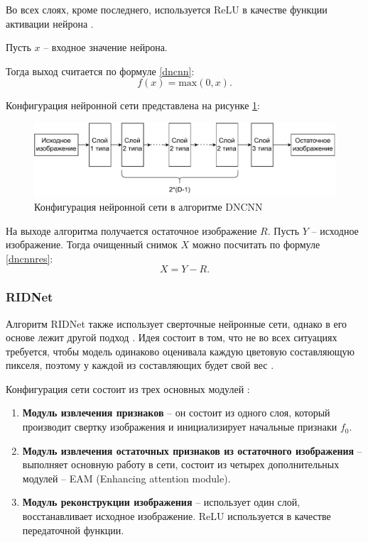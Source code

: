 Во всех слоях, кроме последнего, используется ReLU в качестве функции активации нейрона \cite{dcnn}. 

Пусть $x$ -- входное значение нейрона. 

Тогда выход считается по формуле \eqref{dncnn}: 
\begin{equation}
	\label{dncnn}
	f(x) = \mathrm{max}(0, x).
\end{equation}

Конфигурация нейронной сети представлена на рисунке \ref{fig::dncnn}:
\FloatBarrier
\begin{figure}[h]	
	\begin{center}
		\includegraphics[width=\linewidth]{inc/pdf/dnn.pdf}
	\end{center}
	\captionsetup{justification=centering}
	\caption{Конфигурация нейронной сети в алгоритме DNCNN}
	\label{fig::dncnn}
\end{figure}
\FloatBarrier

\newpage
На выходе алгоритма получается остаточное изображение $R$. 
Пусть $Y$ -- исходное изображение.
Тогда очищенный снимок $X$ можно посчитать по формуле \eqref{dncnnres}:
\begin{equation}
	\label{dncnnres}
	X = Y - R.
\end{equation}

\subsubsection{RIDNet}
Алгоритм RIDNet также использует сверточные нейронные сети, однако в его основе лежит другой подход \cite{ridnet2}.
Идея состоит в том, что не во всех ситуациях требуется, чтобы модель одинаково оценивала каждую цветовую составляющую пикселя, поэтому у каждой из составляющих будет свой вес \cite{ridnet}.

Конфигурация сети состоит из трех основных модулей \cite{ridnet}: 
\begin{enumerate}
	\item \textbf{Модуль извлечения признаков} -- он состоит из одного слоя, который производит свертку изображения и инициализирует начальные признаки $f_0$.
	\item \textbf{Модуль извлечения остаточных признаков из остаточного изображения} -- выполняет основную работу в сети, состоит из четырех дополнительных модулей -- EAM (Enhancing attention module).
	\item  \textbf{Модуль реконструкции изображения} -- использует один слой, восстанавливает исходное изображение. ReLU используется в качестве передаточной функции.
\end{enumerate}


